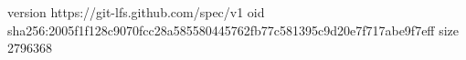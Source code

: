 version https://git-lfs.github.com/spec/v1
oid sha256:2005f1f128c9070fcc28a585580445762fb77c581395c9d20e7f717abe9f7eff
size 2796368
